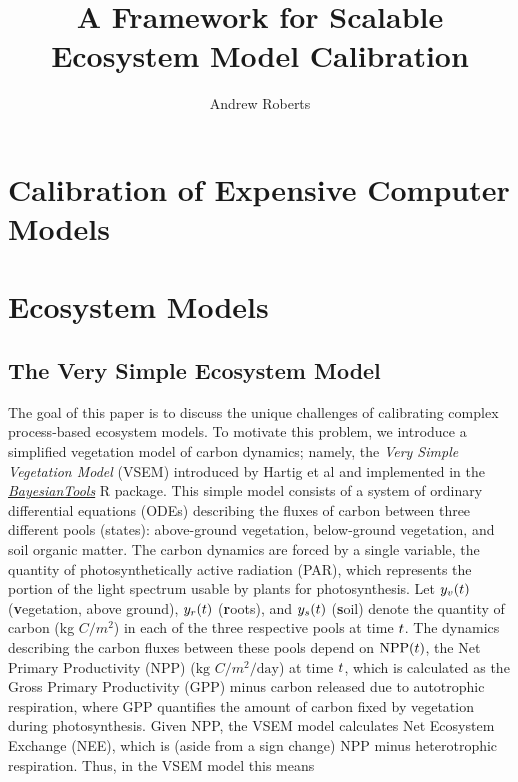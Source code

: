 \documentclass[12pt]{article}
\title{A Framework for Scalable Ecosystem Model Calibration}
\author{Andrew Roberts}
\begin{document}
\maketitle
\tableofcontents
\newpage

\section{Calibration of Expensive Computer Models}

\section{Ecosystem Models}

\subsection{The Very Simple Ecosystem Model}
The goal of this paper is to discuss the unique challenges of calibrating complex process-based ecosystem models. To motivate this problem, we introduce 
a simplified vegetation model of carbon dynamics; namely, the \textit{Very Simple Vegetation Model} (VSEM) introduced by Hartig et al \cite{Hartig} and implemented 
in the \href{https://github.com/florianhartig/BayesianTools}{\textit{BayesianTools}} R package. 
This simple model consists of a system of ordinary differential equations (ODEs) describing the fluxes of carbon between three different pools (states): 
above-ground vegetation, below-ground vegetation, and soil organic matter. The carbon dynamics are forced by a single variable, the quantity of photosynthetically 
active radiation (PAR), which represents the portion of the light spectrum usable by plants for photosynthesis. 
Let $y_v(t)$ (\textbf{v}egetation, above ground), $y_r(t)$ (\textbf{r}oots), and $y_s(t)$ (\textbf{s}oil) denote the quantity of carbon (kg $C/m^2$) in each of the three respective pools at time $t$. 
The dynamics describing the carbon fluxes between these pools depend on $\text{NPP}(t)$, the Net Primary Productivity (NPP) ($\text{kg } C/m^2/\text{day}$) at time $t$, 
which is calculated as the Gross Primary Productivity (GPP) minus carbon released due to autotrophic respiration, where GPP quantifies the amount of carbon 
fixed by vegetation during photosynthesis. Given NPP, the VSEM model calculates Net Ecosystem Exchange (NEE), which is (aside from a sign change) 
NPP minus heterotrophic 
respiration. Thus, in the VSEM model this means 
\end{document}
